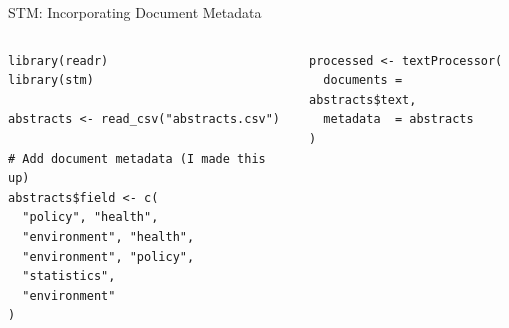 \documentclass[aspectratio=169]{beamer}
\begin{document}
\begin{frame}[fragile]{STM: Incorporating Document Metadata}

\small

\begin{columns}[T]



\begin{lstlisting}[style=Rstyle]
library(readr)
library(stm)

abstracts <- read_csv("abstracts.csv")

# Add document metadata (I made this up)
abstracts$field <- c(
  "policy", "health",
  "environment", "health",
  "environment", "policy",
  "statistics",
  "environment"
)
\end{lstlisting}

\begin{lstlisting}[style=Rstyle]
processed <- textProcessor(
  documents = abstracts$text,
  metadata  = abstracts
)

\end{lstlisting}
\end{columns}
\end{frame}

\end{document}
